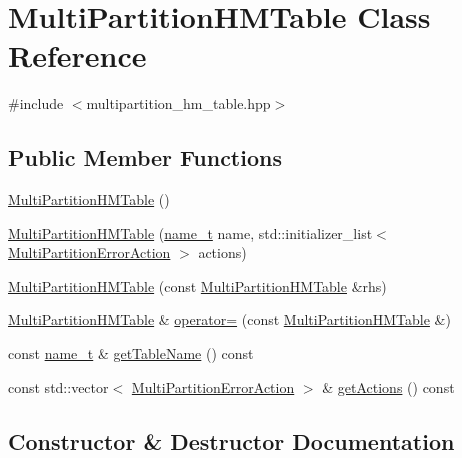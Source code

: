 \hypertarget{classMultiPartitionHMTable}{}\section{Multi\+Partition\+H\+M\+Table Class Reference}
\label{classMultiPartitionHMTable}


{\ttfamily \#include $<$multipartition\+\_\+hm\+\_\+table.\+hpp$>$}

\subsection*{Public Member Functions}
\begin{DoxyCompactItemize}
\item 
\hyperlink{classMultiPartitionHMTable_aa8208a29c4dbab96704f70d79b668a30}{Multi\+Partition\+H\+M\+Table} ()
\item 
\hyperlink{classMultiPartitionHMTable_a54f3c8da8556631837e7eda3e10bd1ca}{Multi\+Partition\+H\+M\+Table} (\hyperlink{structname__t}{name\+\_\+t} name, std\+::initializer\+\_\+list$<$ \hyperlink{classMultiPartitionErrorAction}{Multi\+Partition\+Error\+Action} $>$ actions)
\item 
\hyperlink{classMultiPartitionHMTable_aa55bb66a50a5e60ae60268d3b2671ea5}{Multi\+Partition\+H\+M\+Table} (const \hyperlink{classMultiPartitionHMTable}{Multi\+Partition\+H\+M\+Table} \&rhs)
\item 
\hyperlink{classMultiPartitionHMTable}{Multi\+Partition\+H\+M\+Table} \& \hyperlink{classMultiPartitionHMTable_a066f5ba60ec47109e64c85ca3cefec4f}{operator=} (const \hyperlink{classMultiPartitionHMTable}{Multi\+Partition\+H\+M\+Table} \&)
\item 
const \hyperlink{structname__t}{name\+\_\+t} \& \hyperlink{classMultiPartitionHMTable_aabb264a8a31056e94bc3e624bfe33e67}{get\+Table\+Name} () const 
\item 
const std\+::vector$<$ \hyperlink{classMultiPartitionErrorAction}{Multi\+Partition\+Error\+Action} $>$ \& \hyperlink{classMultiPartitionHMTable_ad361effafc8f244fc2f18cc79bef856a}{get\+Actions} () const 
\end{DoxyCompactItemize}


\subsection{Constructor \& Destructor Documentation}
